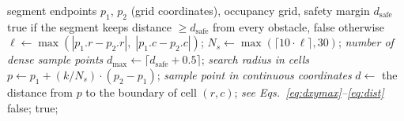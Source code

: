 \documentclass[lettersize,journal]{IEEEtran}
\begin{document}
\begin{algorithm}[!t]
\caption{IsLineFree (collision check with safety margin)}
\label{alg:islinefree}
\begin{algorithmic}[1]
\REQUIRE segment endpoints $p_1$, $p_2$ (grid coordinates), occupancy grid, safety margin $d_{\mathrm{safe}}$
\ENSURE true if the segment keeps distance $\geq d_{\mathrm{safe}}$ from every obstacle, false otherwise
\STATE $\ell \gets \max(|p_1.r - p_2.r|,\; |p_1.c - p_2.c|)$;
\STATE $N_s \gets \max(\lceil 10 \cdot \ell \rceil, 30)$; \quad\textit{number of dense sample points}
\STATE $d_{\max} \gets \lceil d_{\mathrm{safe}} + 0.5 \rceil$; \quad\textit{search radius in cells}
\STATE $p \gets p_1 + (k / N_s) \cdot (p_2 - p_1)$; \quad\textit{sample point in continuous coordinates}
\STATE $d \gets$ the distance from $p$ to the boundary of cell $(r, c)$; \quad\textit{see Eqs.~\eqref{eq:dxymax}--\eqref{eq:dist}}
\STATE \RETURN false;
\ENDIF
\ENDIF
\ENDFOR
\ENDFOR
\STATE \RETURN true;
\end{algorithmic}
\end{algorithm}
\end{document}

